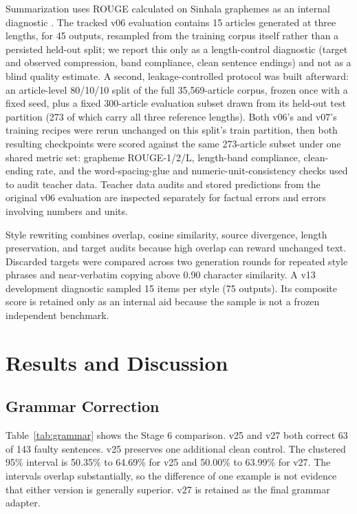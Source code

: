 \documentclass[a4paper,conference]{IEEEtran}
\begin{document}
Summarization uses ROUGE calculated on Sinhala graphemes as an internal
diagnostic \cite{lin2004rouge}. The tracked v06 evaluation contains 15 articles
generated at three lengths, for 45 outputs, resampled from the training corpus
itself rather than a persisted held-out split; we report this only as a
length-control diagnostic (target and observed compression, band compliance,
clean sentence endings) and not as a blind quality estimate. A second,
leakage-controlled protocol was built afterward: an article-level 80/10/10
split of the full 35,569-article corpus, frozen once with a fixed seed, plus
a fixed 300-article evaluation subset drawn from its held-out test partition
(273 of which carry all three reference lengths). Both v06's and v07's
training recipes were rerun unchanged on this split's train partition, then
both resulting checkpoints were scored against the same 273-article subset
under one shared metric set: grapheme ROUGE-1/2/L, length-band compliance,
clean-ending rate, and the word-spacing-glue and numeric-unit-consistency
checks used to audit teacher data. Teacher data audits and stored predictions
from the original v06 evaluation are inspected separately for factual errors
and errors involving numbers and units.

Style rewriting combines overlap, cosine similarity, source divergence, length
preservation, and target audits because high overlap can reward unchanged text.
Discarded targets were compared across two generation rounds for repeated style
phrases and near-verbatim copying above 0.90 character similarity. A v13
development diagnostic sampled 15 items per style (75 outputs). Its composite
score is retained only as an internal aid because the sample is not a frozen
independent benchmark.

\section{Results and Discussion}
\subsection{Grammar Correction}
Table~\ref{tab:grammar} shows the Stage 6 comparison. v25 and v27 both correct
63 of 143 faulty sentences. v25 preserves one additional clean control. The clustered 95\% interval is 50.35\% to 64.69\% for v25 and 50.00\%
to 63.99\% for v27. The intervals overlap substantially, so the difference of
one example is not evidence that either version is generally superior. v27 is
retained as the final grammar adapter.
\end{document}
